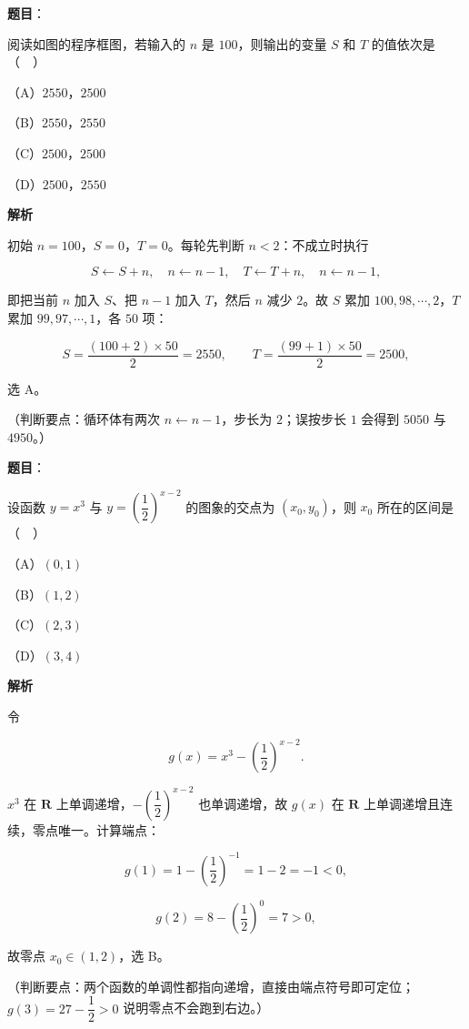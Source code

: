 \begin{answer}

\textbf{题目}：

阅读如图的程序框图，若输入的 $n$ 是 $100$，则输出的变量 $S$ 和 $T$ 的值依次是（　）
\nopagebreak[4]
\begin{center}\end{center}
\nopagebreak[4]
（A）$2550$，$2500$

（B）$2550$，$2550$

（C）$2500$，$2500$

（D）$2500$，$2550$

\textbf{解析}

初始 $n=100$，$S=0$，$T=0$。每轮先判断 $n<2$：不成立时执行

\nopagebreak[4]
\[S\leftarrow S+n,\quad n\leftarrow n-1,\quad T\leftarrow T+n,\quad n\leftarrow n-1,\]

即把当前 $n$ 加入 $S$、把 $n-1$ 加入 $T$，然后 $n$ 减少 $2$。故 $S$ 累加 $100,98,\cdots,2$，$T$ 累加 $99,97,\cdots,1$，各 $50$ 项：

\nopagebreak[4]
\[S=\frac{(100+2)\times50}{2}=2550,\qquad T=\frac{(99+1)\times50}{2}=2500,\]

选 A。

（判断要点：循环体有两次 $n\leftarrow n-1$，步长为 $2$；误按步长 $1$ 会得到 $5050$ 与 $4950$。）


\end{answer}
\begin{answer}

\textbf{题目}：

设函数 $y=x^3$ 与 $y=\left(\dfrac12\right)^{x-2}$ 的图象的交点为 $(x_0,y_0)$，则 $x_0$ 所在的区间是（　）

（A）$(0,1)$

（B）$(1,2)$

（C）$(2,3)$

（D）$(3,4)$

\textbf{解析}

令

\nopagebreak[4]
\[g(x)=x^3-\left(\frac12\right)^{x-2}.\]

$x^3$ 在 $\mathbf R$ 上单调递增，$-\left(\dfrac12\right)^{x-2}$ 也单调递增，故 $g(x)$ 在 $\mathbf R$ 上单调递增且连续，零点唯一。计算端点：

\nopagebreak[4]
\[g(1)=1-\left(\frac12\right)^{-1}=1-2=-1<0,\]

\nopagebreak[4]
\[g(2)=8-\left(\frac12\right)^{0}=7>0,\]

故零点 $x_0\in(1,2)$，选 B。

（判断要点：两个函数的单调性都指向递增，直接由端点符号即可定位；$g(3)=27-\dfrac12>0$ 说明零点不会跑到右边。）


\end{answer}
